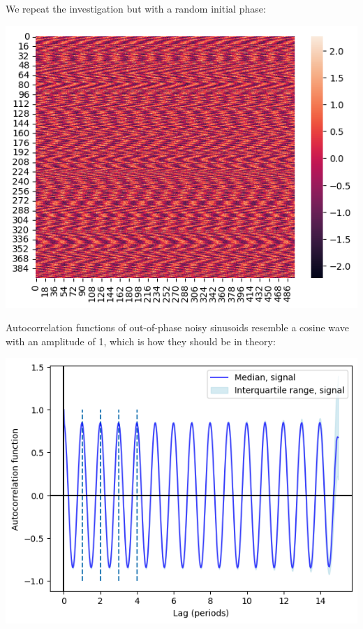 \begin{enumerate}
\begin{enumerate}
We repeat the investigation but with a random initial phase:
\begin{center}
\includegraphics[width=.9\linewidth]{noisysinusoids_outofphase.png}
\end{center}

Autocorrelation functions of out-of-phase noisy sinusoids resemble a cosine wave with an amplitude of 1, which is how they should be in theory:
\begin{center}
\includegraphics[width=.9\linewidth]{noisysinusoids_outofphase_acf.png}
\end{center}


\end{enumerate}
\end{enumerate}
